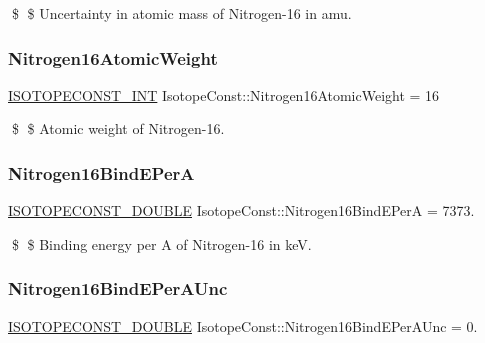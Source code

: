 \$ \$ Uncertainty in atomic mass of Nitrogen-\/16 in amu. \mbox{\label{group___isotope_const-_nitrogen-_n16_ga625ef08cba2be891221f1da5266aeaba}} 
\subsubsection{\texorpdfstring{Nitrogen16\+Atomic\+Weight}{Nitrogen16AtomicWeight}}
{\footnotesize\ttfamily \mbox{\hyperlink{group___isotope_const-_macros_ga5f18360b3e99483a35c32d789e62621c}{I\+S\+O\+T\+O\+P\+E\+C\+O\+N\+S\+T\+\_\+\+I\+NT}} Isotope\+Const\+::\+Nitrogen16\+Atomic\+Weight = 16}

\$ \$ Atomic weight of Nitrogen-\/16. \mbox{\label{group___isotope_const-_nitrogen-_n16_ga37ca9de8589e529c94afb98bec5b077b}} 
\subsubsection{\texorpdfstring{Nitrogen16\+Bind\+E\+PerA}{Nitrogen16BindEPerA}}
{\footnotesize\ttfamily \mbox{\hyperlink{group___isotope_const-_macros_ga8f45a7272ce02c0b4c65c44636ed719a}{I\+S\+O\+T\+O\+P\+E\+C\+O\+N\+S\+T\+\_\+\+D\+O\+U\+B\+LE}} Isotope\+Const\+::\+Nitrogen16\+Bind\+E\+PerA = 7373.}

\$ \$ Binding energy per A of Nitrogen-\/16 in keV. \mbox{\label{group___isotope_const-_nitrogen-_n16_gac904c8ae5f38b65eceb463c7c4f2d98c}} 
\subsubsection{\texorpdfstring{Nitrogen16\+Bind\+E\+Per\+A\+Unc}{Nitrogen16BindEPerAUnc}}
{\footnotesize\ttfamily \mbox{\hyperlink{group___isotope_const-_macros_ga8f45a7272ce02c0b4c65c44636ed719a}{I\+S\+O\+T\+O\+P\+E\+C\+O\+N\+S\+T\+\_\+\+D\+O\+U\+B\+LE}} Isotope\+Const\+::\+Nitrogen16\+Bind\+E\+Per\+A\+Unc = 0.}

